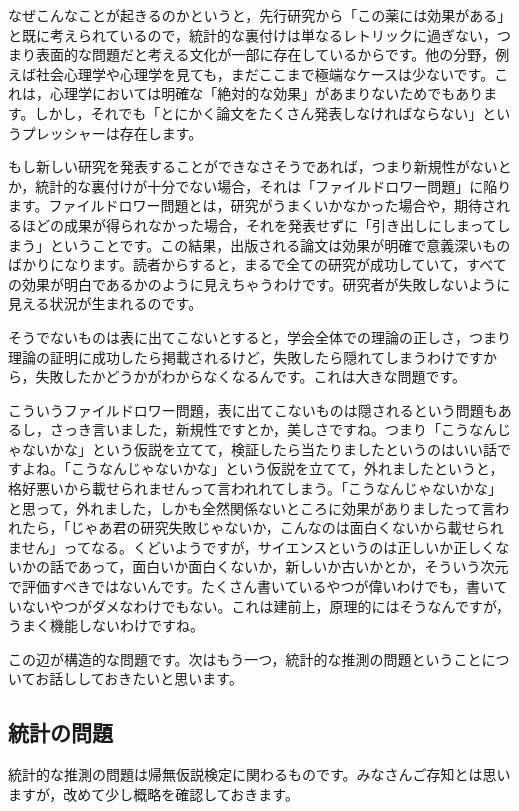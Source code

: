\documentclass{ltjsbook}
\begin{document}
なぜこんなことが起きるのかというと，先行研究から「この薬には効果がある」と既に考えられているので，統計的な裏付けは単なるレトリックに過ぎない，つまり表面的な問題だと考える文化が一部に存在しているからです。他の分野，例えば社会心理学や心理学を見ても，まだここまで極端なケースは少ないです。これは，心理学においては明確な「絶対的な効果」があまりないためでもあります。しかし，それでも「とにかく論文をたくさん発表しなければならない」というプレッシャーは存在します。

もし新しい研究を発表することができなさそうであれば，つまり新規性がないとか，統計的な裏付けが十分でない場合，それは「ファイルドロワー問題」に陥ります。ファイルドロワー問題とは，研究がうまくいかなかった場合や，期待されるほどの成果が得られなかった場合，それを発表せずに「引き出しにしまってしまう」ということです。この結果，出版される論文は効果が明確で意義深いものばかりになります。読者からすると，まるで全ての研究が成功していて，すべての効果が明白であるかのように見えちゃうわけです。研究者が失敗しないように見える状況が生まれるのです。

そうでないものは表に出てこないとすると，学会全体での理論の正しさ，つまり理論の証明に成功したら掲載されるけど，失敗したら隠れてしまうわけですから，失敗したかどうかがわからなくなるんです。これは大きな問題です。

こういうファイルドロワー問題，表に出てこないものは隠されるという問題もあるし，さっき言いました，新規性ですとか，美しさですね。つまり「こうなんじゃないかな」という仮説を立てて，検証したら当たりましたというのはいい話ですよね。「こうなんじゃないかな」という仮説を立てて，外れましたというと，格好悪いから載せられませんって言われれてしまう。「こうなんじゃないかな」と思って，外れました，しかも全然関係ないところに効果がありましたって言われたら，「じゃあ君の研究失敗じゃないか，こんなのは面白くないから載せられません」ってなる。くどいようですが，サイエンスというのは正しいか正しくないかの話であって，面白いか面白くないか，新しいか古いかとか，そういう次元で評価すべきではないんです。たくさん書いているやつが偉いわけでも，書いていないやつがダメなわけでもない。これは建前上，原理的にはそうなんですが，うまく機能しないわけですね。

この辺が構造的な問題です。次はもう一つ，統計的な推測の問題ということについてお話ししておきたいと思います。

\subsection{統計の問題}

統計的な推測の問題は帰無仮説検定に関わるものです。みなさんご存知とは思いますが，改めて少し概略を確認しておきます。
\end{document}
